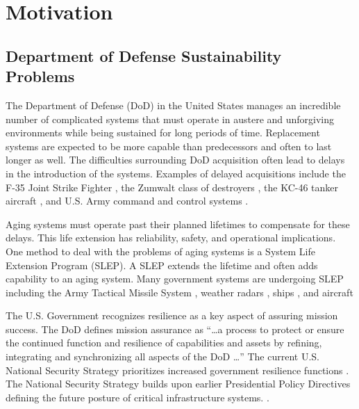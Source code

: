 




\section{Motivation}
\label{S:1}

\subsection{Department of Defense Sustainability Problems}

The Department of Defense (DoD) in the United States manages an
incredible number of complicated systems that must operate in austere
and unforgiving environments while being sustained for long periods of
time. Replacement systems are expected to be more capable than
predecessors and often to last longer as well. The difficulties
surrounding DoD acquisition often lead to delays in 
the introduction of the systems. Examples of delayed acquisitions
include the F-35 Joint Strike Fighter
\cite{Werner2018}, the Zumwalt class of destroyers \cite{Katz2018},
the KC-46 tanker aircraft \cite{Mehta2016}, and U.S. Army command and
control systems \cite{Edwards2017}.

Aging systems must operate past
their planned lifetimes to compensate for these delays. This life extension has
reliability, safety, and operational implications. One method to deal
with the problems of aging systems is a System Life Extension
Program (SLEP). A SLEP extends the lifetime and often adds capability
to an aging system. Many government systems are undergoing SLEP including the Army
Tactical Missile System \cite{DOTE2017,zacks2015}, weather radars
\cite{ROC2018}, ships 
\cite{eckstein2018,NAVSEA2018}, and aircraft
\cite{Lockheed2017,Garbarino2018,Tirpak2015,jennings2018}

The U.S. Government recognizes resilience as a key aspect of assuring
mission success.  The DoD
defines mission assurance as ``\ldots a process to 
protect or ensure the continued function and resilience of
capabilities and assets by refining, integrating and synchronizing all
aspects of the DoD \ldots'' \cite{DepartmentofDefense2016a} The
current U.S. National Security  
Strategy prioritizes increased government resilience functions
\cite{Trump2017}. The National Security Strategy builds upon
earlier Presidential Policy Directives defining the future posture of
critical infrastructure systems. \citep{PPD8,PPD21}. 

